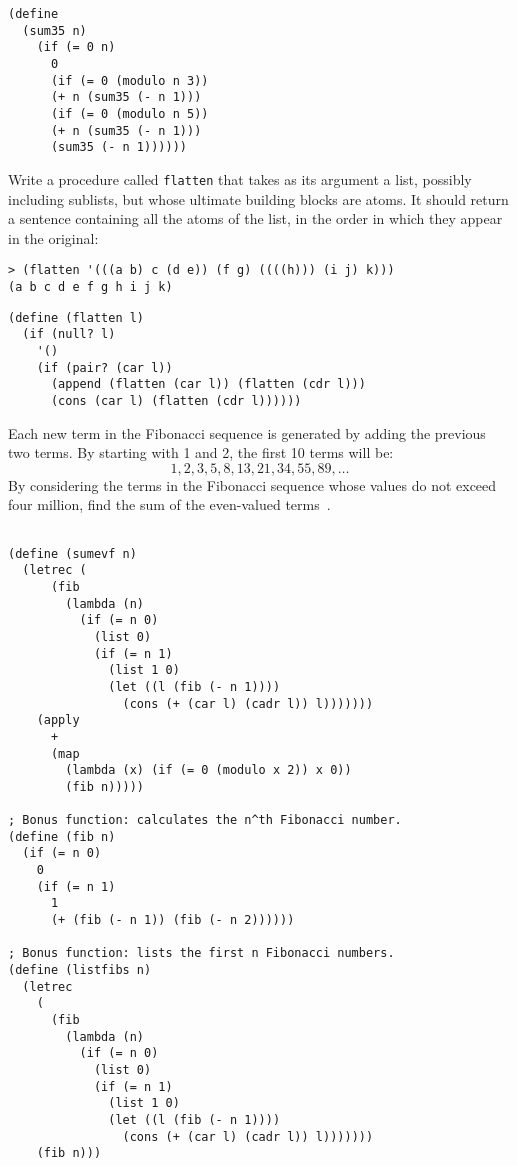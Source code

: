 \begin{questions}
\begin{solution}
  \begin{verbatim}
(define 
  (sum35 n)
    (if (= 0 n)
      0
      (if (= 0 (modulo n 3))
      (+ n (sum35 (- n 1)))
      (if (= 0 (modulo n 5))
      (+ n (sum35 (- n 1)))
      (sum35 (- n 1))))))
  \end{verbatim}
\end{solution}

\question
Write a procedure called \texttt{flatten} that takes as its argument a list, possibly including sublists, but whose ultimate building blocks are atoms.
It should return a sentence containing all the atoms of the list, in the order in which they appear in the original:
\begin{verbatim}
> (flatten '(((a b) c (d e)) (f g) ((((h))) (i j) k)))
(a b c d e f g h i j k)
\end{verbatim}

\begin{solution}
  \begin{verbatim}
(define (flatten l)
  (if (null? l)
    '()
    (if (pair? (car l))
      (append (flatten (car l)) (flatten (cdr l)))
      (cons (car l) (flatten (cdr l))))))
  \end{verbatim}
\end{solution}

\question
Each new term in the Fibonacci sequence is generated by adding the previous two terms.
By starting with 1 and 2, the first 10 terms will be:
\[ 1, 2, 3, 5, 8, 13, 21, 34, 55, 89, \ldots \]
By considering the terms in the Fibonacci sequence whose values do not exceed four million, find the sum of the even-valued terms~\cite{projecteuler}.

\begin{solution}
  \begin{verbatim}
 
(define (sumevf n)
  (letrec (
      (fib
        (lambda (n)
          (if (= n 0)
            (list 0)
            (if (= n 1)
              (list 1 0)
              (let ((l (fib (- n 1))))
                (cons (+ (car l) (cadr l)) l)))))))
    (apply
      +
      (map
        (lambda (x) (if (= 0 (modulo x 2)) x 0))
        (fib n)))))

; Bonus function: calculates the n^th Fibonacci number. 
(define (fib n)
  (if (= n 0)
    0
    (if (= n 1)
      1
      (+ (fib (- n 1)) (fib (- n 2))))))

; Bonus function: lists the first n Fibonacci numbers.
(define (listfibs n)
  (letrec
    (
      (fib
        (lambda (n)
          (if (= n 0)
            (list 0)
            (if (= n 1)
              (list 1 0)
              (let ((l (fib (- n 1))))
                (cons (+ (car l) (cadr l)) l)))))))
    (fib n)))
  \end{verbatim}
\end{solution}


\end{questions}
